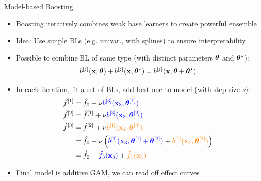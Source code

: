 \documentclass[10pt,compress,t,notes=noshow, xcolor=table]{beamer}
\begin{document}
\begin{frame}{Model-based Boosting %
}

\begin{itemize}%
\item Boosting iteratively combines weak base learners to create powerful ensemble 
\item
Idea: Use simple BLs (e.g. univar., with splines) to ensure interpretability
\item
Possible to combine BL of same type (with distinct parameters $\bm{\theta}$ and $\bm{\theta}^{\star}$):
$$b^{[j]}(\mathbf{x}, \bm{\theta}) + b^{[j]}(\mathbf{x}, \bm{\theta}^{\star}) = b^{[j]}(\mathbf{x}, \bm{\theta} + \bm{\theta}^{\star}) $$
\pause
\item %
In each iteration, fit a set of BLs, add best one to model (with step-size $\nu$):
\begin{align*}
\hat{f}^{[1]} &= \hat{f}_0 + \nu \textcolor{blue}{b^{[3]}(\mathbf{x}_3, \bm{\theta}^{[1]})} \\
\hat{f}^{[2]} &= \hat{f}^{[1]} + \nu \textcolor{blue}{b^{[3]}(\mathbf{x}_3, \bm{\theta}^{[2]})} \\
\hat{f}^{[3]} &= \hat{f}^{[2]} + \nu \textcolor{orange}{b^{[1]}(\mathbf{x}_1, \bm{\theta}^{[3]})} \\
&= \hat{f}_0 + \nu \left(\textcolor{blue}{b^{[3]}(\mathbf{x}_3, \bm{\theta}^{[1]} + \bm{\theta}^{[2]})} + \textcolor{orange}{b^{[1]}(\mathbf{x}_1, \bm{\theta}^{[3]})}\right) 
\\
&= \hat{f}_0 + \textcolor{blue}{\hat{f}_3(\mathbf{x}_3)} + \textcolor{orange}{\hat{f}_1(\mathbf{x}_1)}
\end{align*}
\item Final model is additive GAM, we can read off effect curves
\end{itemize}
\end{frame}
\end{document}
